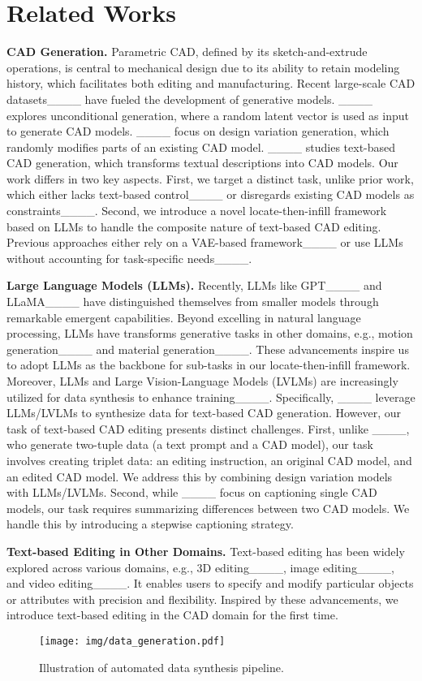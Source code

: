 \section{Related Works}
\label{related_work}  
\noindent\textbf{CAD Generation.}  
Parametric CAD, defined by its sketch-and-extrude operations, is central to mechanical design due to its ability to retain modeling history, which facilitates both editing and manufacturing. 
Recent large-scale CAD datasets____ have fueled the development of generative models.
____ explores unconditional generation, where a random latent vector is used as input to generate CAD models. 
____ focus on design variation generation, which randomly modifies parts of an existing CAD model. 
____ studies text-based CAD generation, which transforms textual descriptions into CAD models.
Our work differs in two key aspects.
First, we target a distinct task, unlike prior work, which either lacks text-based control____ or disregards existing CAD models as constraints____.
Second, we introduce a novel locate-then-infill framework based on LLMs to handle the composite nature of text-based CAD editing.
Previous approaches either rely on a VAE-based framework____ or use LLMs without accounting for task-specific needs____.


\noindent\textbf{Large Language Models (LLMs).} 
Recently, LLMs like GPT____ and LLaMA____ have distinguished themselves from smaller models through remarkable emergent capabilities. 
Beyond excelling in natural language processing, LLMs have transforms generative tasks in other domains, e.g., motion generation____ and material generation____. 
These advancements inspire us to adopt LLMs as the backbone for sub-tasks in our locate-then-infill framework.
Moreover, LLMs and Large Vision-Language Models (LVLMs) are increasingly utilized for data synthesis to enhance training____. 
Specifically, ____ leverage LLMs/LVLMs to synthesize data for text-based CAD generation. 
However, our task of text-based CAD editing presents distinct challenges.
First, unlike ____, who generate two-tuple data (a text prompt and a CAD model), our task involves creating triplet data: an editing instruction, an original CAD model, and an edited CAD model. 
We address this by combining design variation models with LLMs/LVLMs.
Second, while ____ focus on captioning single CAD models, our task requires summarizing differences between two CAD models. 
We handle this by introducing a stepwise captioning strategy.


\noindent\textbf{Text-based Editing in Other Domains.}
Text-based editing has been widely explored across various domains, e.g., 3D editing____, image editing____, and video editing____.
It enables users to specify and modify particular objects or attributes with precision and flexibility.
Inspired by these advancements, we introduce text-based editing in the CAD domain for the first time.

\begin{figure*}[t]
\begin{center}
\texttt{[image: img/data\_generation.pdf]}  
\end{center}
\caption{
Illustration of automated data synthesis pipeline.
}
\label{fig:data_generation}
\end{figure*}